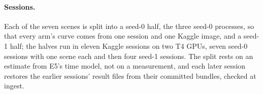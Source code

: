\paragraph{Sessions.}
Each of the seven scenes is split into a seed-0 half, the three seed-0 processes, so that every arm's curve comes from one session and one Kaggle image, and a seed-1 half; the halves run in eleven Kaggle sessions on two T4 GPUs, seven seed-0 sessions with one scene each and then four seed-1 sessions. %
The split rests on an estimate from E5's time model, not on a measurement, and each later session restores the earlier sessions' result files from their committed bundles, checked at ingest. %
